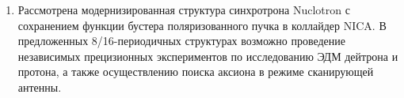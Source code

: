 \begin{enumerate}
  \item Рассмотрена модернизированная структура синхротрона Nuclotron с сохранением функции бустера поляризованного пучка в коллайдер NICA. В предложенных 8/16-периодичных структурах возможно проведение независимых прецизионных экспериментов по исследованию ЭДМ дейтрона и протона, а также осуществлению поиска аксиона в режиме сканирующей антенны.
  
\end{enumerate}
